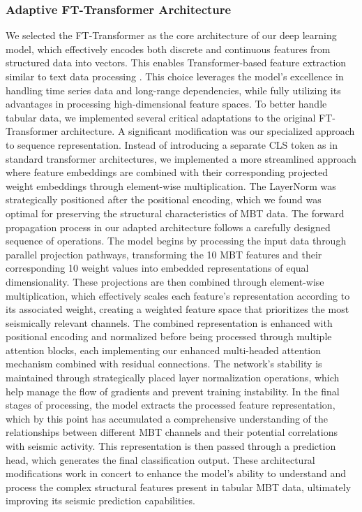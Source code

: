 \documentclass[fleqn,10pt]{wlscirep_mdpi_style}
\begin{document}
\subsubsection{Adaptive FT-Transformer Architecture}
We selected the FT-Transformer \cite{gorishniyRevisitingDeepLearning2021} as the core architecture of our deep learning model, which effectively encodes both discrete and continuous features from structured data into vectors. This enables Transformer-based feature extraction similar to text data processing \cite{vaswaniAttentionAllYou2017}. This choice leverages the model's excellence in handling time series data and long-range dependencies, while fully utilizing its advantages in processing high-dimensional feature spaces.
To better handle tabular data, we implemented several critical adaptations to the original FT-Transformer architecture. A significant modification was our specialized approach to sequence representation. Instead of introducing a separate CLS token as in standard transformer architectures, we implemented a more streamlined approach where feature embeddings are combined with their corresponding projected weight embeddings through element-wise multiplication. The LayerNorm was strategically positioned after the positional encoding, which we found was optimal for preserving the structural characteristics of MBT data.
The forward propagation process in our adapted architecture follows a carefully designed sequence of operations. The model begins by processing the input data through parallel projection pathways, transforming the 10 MBT features and their corresponding 10 weight values into embedded representations of equal dimensionality. These projections are then combined through element-wise multiplication, which effectively scales each feature's representation according to its associated weight, creating a weighted feature space that prioritizes the most seismically relevant channels.
The combined representation is enhanced with positional encoding and normalized before being processed through multiple attention blocks, each implementing our enhanced multi-headed attention mechanism combined with residual connections. The network's stability is maintained through strategically placed layer normalization operations, which help manage the flow of gradients and prevent training instability.
In the final stages of processing, the model extracts the processed feature representation, which by this point has accumulated a comprehensive understanding of the relationships between different MBT channels and their potential correlations with seismic activity. This representation is then passed through a prediction head, which generates the final classification output. These architectural modifications work in concert to enhance the model's ability to understand and process the complex structural features present in tabular MBT data, ultimately improving its seismic prediction capabilities.
\end{document}
